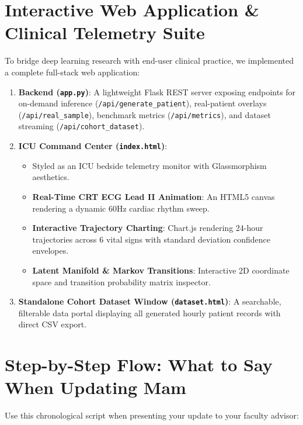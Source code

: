 \documentclass[11pt,a4paper]{article}
\begin{document}
\section{Interactive Web Application \& Clinical Telemetry Suite}

To bridge deep learning research with end-user clinical practice, we implemented a complete full-stack web application:
\begin{enumerate}
    \item \textbf{Backend (\texttt{app.py})}: A lightweight Flask REST server exposing endpoints for on-demand inference (\texttt{/api/generate\_patient}), real-patient overlays (\texttt{/api/real\_sample}), benchmark metrics (\texttt{/api/metrics}), and dataset streaming (\texttt{/api/cohort\_dataset}).
    \item \textbf{ICU Command Center (\texttt{index.html})}:
    \begin{itemize}
        \item Styled as an ICU bedside telemetry monitor with Glassmorphism aesthetics.
        \item \textbf{Real-Time CRT ECG Lead II Animation}: An HTML5 canvas rendering a dynamic 60Hz cardiac rhythm sweep.
        \item \textbf{Interactive Trajectory Charting}: Chart.js rendering 24-hour trajectories across 6 vital signs with standard deviation confidence envelopes.
        \item \textbf{Latent Manifold & Markov Transitions}: Interactive 2D coordinate space and transition probability matrix inspector.
    \end{itemize}
    \item \textbf{Standalone Cohort Dataset Window (\texttt{dataset.html})}: A searchable, filterable data portal displaying all generated hourly patient records with direct CSV export.
\end{enumerate}

\section{Step-by-Step Flow: What to Say When Updating Mam}

Use this chronological script when presenting your update to your faculty advisor:
\end{document}
